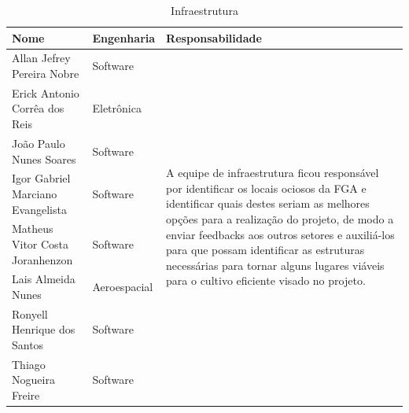 \begin{anexosenv}
  \begin{table}[!htb]
    \centering
    \begin{tabular}{p{7cm}p{}p{}}
      \toprule
        \textbf{Nome} & \textbf{Engenharia} & \textbf{Responsabilidade} \\
      \midrule
        Allan Jefrey Pereira Nobre        & Software        & \multirow{8}{6,5cm}{A equipe de infraestrutura ficou responsável por identificar
                                                              os locais ociosos da FGA e identificar quais destes seriam as melhores opções
                                                              para a realização do projeto, de modo a enviar feedbacks aos outros setores e
                                                              auxiliá-los para que possam identificar as estruturas necessárias para tornar
                                                              alguns lugares viáveis para o cultivo eficiente visado no projeto.}           \\ \cmidrule(r){1-2}
        Erick Antonio Corrêa dos Reis     & Eletr\^{o}nica  & \\ \cmidrule(r){1-2}
        João Paulo Nunes Soares           & Software        & \\ \cmidrule(r){1-2}
        Igor Gabriel Marciano Evangelista & Software        & \\ \cmidrule(r){1-2}
        Matheus Vitor Costa Joranhenzon   & Software        & \\ \cmidrule(r){1-2}
        Lais Almeida Nunes                & Aeroespacial    & \\ \cmidrule(r){1-2}
        Ronyell Henrique dos Santos       & Software        & \\ \cmidrule(r){1-2}
        Thiago Nogueira Freire            & Software        & \\
      \bottomrule
    \end{tabular}
    \caption{Infraestrutura}
  \end{table}


\end{anexosenv}
